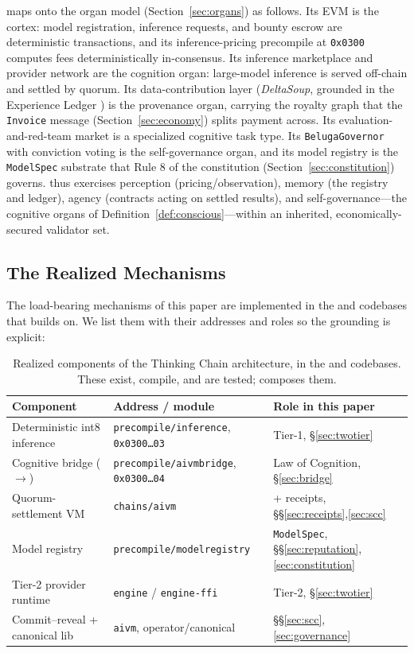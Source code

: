 \Beluga{} maps onto the organ model (Section~\ref{sec:organs}) as follows. Its EVM is the \CChain{} cortex: model registration, inference requests, and bounty escrow are deterministic transactions, and its inference-pricing precompile at \texttt{0x0300} computes fees deterministically in-consensus. Its inference marketplace and provider network are the \AChain{} cognition organ: large-model inference is served off-chain and settled by quorum. Its data-contribution layer (\emph{DeltaSoup}, grounded in the Experience Ledger \cite{zoo-experience-ledger}) is the \DChain{} provenance organ, carrying the royalty graph that the \texttt{Invoice} message (Section~\ref{sec:economy}) splits payment across. Its evaluation-and-red-team market is a specialized cognitive task type. Its \texttt{BelugaGovernor} with conviction voting is the \GChain{} self-governance organ, and its model registry is the \texttt{ModelSpec} substrate that Rule 8 of the constitution (Section~\ref{sec:constitution}) governs. \Beluga{} thus exercises perception (pricing/observation), memory (the registry and ledger), agency (contracts acting on settled results), and self-governance---the cognitive organs of Definition~\ref{def:conscious}---within an inherited, economically-secured validator set.

\subsection{The Realized Mechanisms}

The load-bearing mechanisms of this paper are implemented in the \Lux{} and \Hanzo{} codebases that \Beluga{} builds on. We list them with their addresses and roles so the grounding is explicit:

\begin{table}[h]
\centering
\caption{Realized components of the Thinking Chain architecture, in the \Lux{} and \Hanzo{} codebases. These exist, compile, and are tested; \Beluga{} composes them.}
\label{tab:realized}
\small
\begin{tabular}{@{}lll@{}}
\toprule
Component & Address / module & Role in this paper \\
\midrule
Deterministic int8 inference & \texttt{precompile/inference}, \texttt{0x0300\dots03} & Tier-1, \S\ref{sec:twotier} \\
Cognitive bridge (\CChain{}$\to$\AChain{}) & \texttt{precompile/aivmbridge}, \texttt{0x0300\dots04} & Law of Cognition, \S\ref{sec:bridge} \\
Quorum-settlement VM & \texttt{chains/aivm} & \SCC{} + receipts, \S\S\ref{sec:receipts},\ref{sec:scc} \\
Model registry & \texttt{precompile/modelregistry} & \texttt{ModelSpec}, \S\S\ref{sec:reputation},\ref{sec:constitution} \\
Tier-2 provider runtime & \Hanzo{} \texttt{engine} / \texttt{engine-ffi} & Tier-2, \S\ref{sec:twotier} \\
Commit--reveal + canonical lib & \texttt{aivm}, operator/canonical & \S\S\ref{sec:scc},\ref{sec:governance} \\
\bottomrule
\end{tabular}
\end{table}

